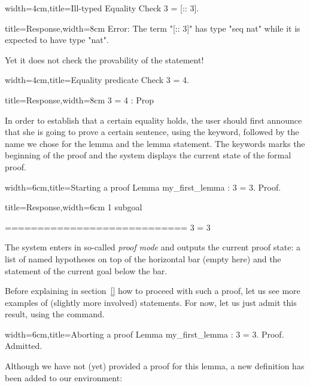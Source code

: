 \begin{coq}{width=4cm,title=Ill-typed Equality}
Check 3 = [:: 3].
$~$
\end{coq}
\begin{coqout}{title=Response,width=8cm}
Error: The term "[:: 3]" has type "seq nat"
 while it is expected to have type "nat".
\end{coqout}

Yet it does not check the provability of the statement!

\begin{coq}{width=4cm,title=Equality predicate}
Check 3 = 4.
\end{coq}
\begin{coqout}{title=Response,width=8cm}
3 = 4 : Prop
\end{coqout}

In order to establish that a certain equality holds, the user should
first announce that she is going to prove a certain sentence, using
the  keyword, followed by the name we chose for the lemma and
the lemma statement. 
The  keywords marks the beginning of the proof and the system
displays the current state of the formal proof.

\begin{coq}{width=6cm,title=Starting a proof}
Lemma my_first_lemma : 3 = 3.
Proof.
\end{coq}
\begin{coqout}{title=Response,width=6cm}
1 subgoal

  ============================
   3 = 3
\end{coqout}
The system enters in so-called \emph{proof mode} and outputs the
current proof state: a list of named hypotheses on top of the
horizontal bar (empty here) and the statement of the current goal
below the bar.

Before explaining in section~\ref{} how to proceed with such a proof,
let us see more examples of (slightly more involved) statements.
For now, let us just admit this result, using the 
command.

\begin{coq}{width=6cm,title=Aborting a proof}
Lemma my_first_lemma : 3 = 3.
Proof.
Admitted.
\end{coq}

Although we have not (yet) provided a proof for this lemma, a new
definition has been added to our environment:

